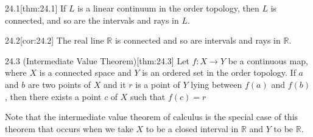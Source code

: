 \begin{thmBox}{24.1}[thm:24.1]
    If \( L \) is a linear continuum in the order topology, then \( L \) is 
    connected, and so are the intervals and rays in \( L \).

    \baseRule

    \begin{proofBox}

    \end{proofBox}
\end{thmBox}

\begin{thmBox}[Corollary]{24.2}[cor:24.2]
    The real line \( \mathbb{R} \) is connected and so are intervals and rays 
    in \( \mathbb{R} \).

    \baseRule

    \begin{proofBox}

    \end{proofBox}
\end{thmBox}

\begin{thmBox}{24.3 (Intermediate Value Theorem)}[thm:24.3]
    Let \( f: X \rightarrow Y \) be a continuous map, where \( X \) is a 
    connected space and \( Y \) is an ordered set in the order topology.
    If \( a \) and \( b \) are two points of \( X \) and it \( r \) is a point
    of \( Y \) lying between \( f ( a ) \) and \( f ( b ) \), then
    there exists a point \( c \) of \( X \) such that \( f ( c ) = r \)

    \baseSkip 

    Note that the intermediate value theorem of calculus is the special case of
    this theorem that occurs when we take \( X \) to be a closed interval in 
    \( \mathbb{R} \) and \( Y \) to be \( \mathbb{R} \).

    \baseRule

    \begin{proofBox}

    \end{proofBox}
\end{thmBox}

